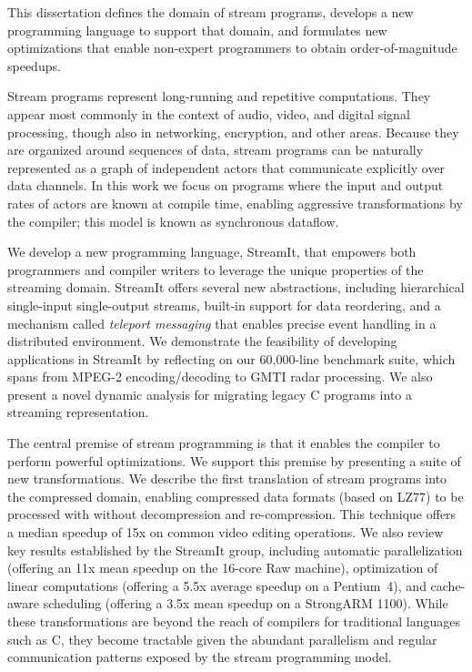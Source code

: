 This dissertation defines the domain of stream programs, develops a
new programming language to support that domain, and formulates new
optimizations that enable non-expert programmers to obtain
order-of-magnitude speedups.

Stream programs represent long-running and repetitive computations.
They appear most commonly in the context of audio, video, and digital
signal processing, though also in networking, encryption, and other
areas.  Because they are organized around sequences of data, stream
programs can be naturally represented as a graph of independent actors
that communicate explicitly over data channels.  In this work we focus
on programs where the input and output rates of actors are known at
compile time, enabling aggressive transformations by the compiler;
this model is known as synchronous dataflow.

We develop a new programming language, StreamIt, that empowers both
programmers and compiler writers to leverage the unique properties of
the streaming domain.  StreamIt offers several new abstractions,
including hierarchical single-input single-output streams, built-in
support for data reordering, and a mechanism called {\it teleport
  messaging} that enables precise event handling in a distributed
environment.  We demonstrate the feasibility of developing
applications in StreamIt by reflecting on our 60,000-line benchmark
suite, which spans from MPEG-2 encoding/decoding to GMTI radar
processing.  We also present a novel dynamic analysis for migrating
legacy C programs into a streaming representation.

The central premise of stream programming is that it enables the
compiler to perform powerful optimizations.  We support this premise
by presenting a suite of new transformations.  We describe the first
translation of stream programs into the compressed domain, enabling
compressed data formats (based on LZ77) to be processed with without
decompression and re-compression.  This technique offers a median
speedup of 15x on common video editing operations.  We also review key
results established by the StreamIt group, including automatic
parallelization (offering an 11x mean speedup on the 16-core Raw
machine), optimization of linear computations (offering a 5.5x average
speedup on a Pentium~4), and cache-aware scheduling (offering a 3.5x
mean speedup on a StrongARM 1100).  While these transformations are
beyond the reach of compilers for traditional languages such as C,
they become tractable given the abundant parallelism and regular
communication patterns exposed by the stream programming model.
